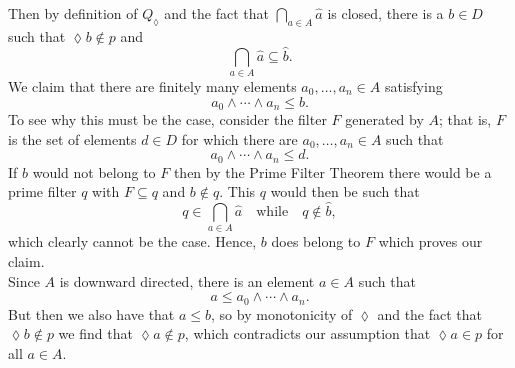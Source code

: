 \documentclass[12pt]{article}
\begin{document}
Then by definition of $Q_{\lozenge}$ and the fact that $\bigcap_{a \in A} \widehat{a}$ is closed, 
there is a $b \in D$ such that $\lozenge b \notin p$ and 
\[
\bigcap_{a \in A} \widehat{a} \subseteq \widehat{b}.
\]
We claim that there are finitely many elements $a_{0}, \dots, a_{n} \in A$ satisfying
\[
a_{0} \wedge \cdots \wedge a_{n} \leq b.
\]
To see why this must be the case, consider the filter $F$ generated by $A$; 
that is, $F$ is the set of elements $d \in D$ for which there are $a_{0}, \dots, a_{n} \in A$ such that 
\[
a_{0} \wedge \cdots \wedge a_{n} \leq d.
\]
If $b$ would not belong to $F$ then by the Prime Filter Theorem there would be a prime filter $q$ with $F \subseteq q$ and $b \notin q$.  
This $q$ would then be such that 
\[
q \in \bigcap_{a \in A} \widehat{a} \quad \text{while} \quad q \notin \widehat{b},
\]
which clearly cannot be the case.  
Hence, $b$ does belong to $F$ which proves our claim.\\
Since $A$ is downward directed, there is an element $a \in A$ such that 
\[
a \leq a_{0} \wedge \cdots \wedge a_{n}.
\]
But then we also have that $a \leq b$, so by monotonicity of $\lozenge$ and the fact that $\lozenge b \notin p$ we find that $\lozenge a \notin p$, which contradicts our assumption that $\lozenge a \in p$ for all $a \in A$. 
\end{document}
